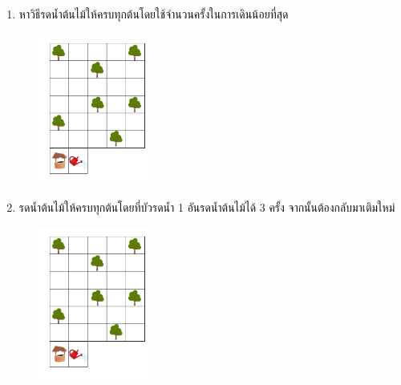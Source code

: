 \begin{enumerate}
\begin{center}
    \end{center}
    \item หาวิธีรดน้ำต้นไม้ให้ครบทุกต้นโดยใช้จำนวนครั้งในการเดินน้อยที่สุด
    \begin{center}
        \includegraphics[width=5cm, height=5cm]{pic-toro/exam/treemed.png}
    \end{center}
    \item รดน้ำต้นไม้ให้ครบทุกต้นโดยที่บัวรดน้ำ 1 อันรดน้ำต้นไม้ได้ 3 ครั้ง จากนั้นต้องกลับมาเติมใหม่
    \begin{center}
        \includegraphics[width=5cm, height=5cm]{pic-toro/exam/treehard.png}
    \end{center} 
\end{enumerate}

